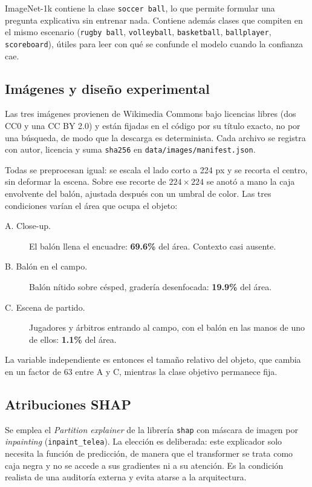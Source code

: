 \documentclass[11pt]{article}
\begin{document}
ImageNet-1k contiene la clase \texttt{soccer ball}, lo que permite formular una
pregunta explicativa sin entrenar nada. Contiene además clases que compiten en el
mismo escenario (\texttt{rugby ball}, \texttt{volleyball}, \texttt{basketball},
\texttt{ballplayer}, \texttt{scoreboard}), útiles para leer con qué se confunde el
modelo cuando la confianza cae.

\subsection{Imágenes y diseño experimental}

Las tres imágenes provienen de Wikimedia Commons bajo licencias libres (dos CC0 y una
CC BY 2.0) y están fijadas en el código por su título exacto, no por una búsqueda, de
modo que la descarga es determinista. Cada archivo se registra con autor, licencia y
suma \texttt{sha256} en \texttt{data/images/manifest.json}.

Todas se preprocesan igual: se escala el lado corto a 224 px y se recorta el centro,
sin deformar la escena. Sobre ese recorte de $224\times224$ se anotó a mano la caja
envolvente del balón, ajustada después con un umbral de color. Las tres condiciones
varían el área que ocupa el objeto:

\begin{description}
  \item[A. Close-up.] El balón llena el encuadre: \textbf{69.6\%} del área. Contexto
        casi ausente.
  \item[B. Balón en el campo.] Balón nítido sobre césped, gradería desenfocada:
        \textbf{19.9\%} del área.
  \item[C. Escena de partido.] Jugadores y árbitros entrando al campo, con el balón
        en las manos de uno de ellos: \textbf{1.1\%} del área.
\end{description}

La variable independiente es entonces el tamaño relativo del objeto, que cambia en
un factor de $63$ entre A y C, mientras la clase objetivo permanece fija.

\subsection{Atribuciones SHAP}

Se emplea el \emph{Partition explainer} de la librería \texttt{shap} con máscara de
imagen por \emph{inpainting} (\texttt{inpaint\_telea}). La elección es deliberada:
este explicador solo necesita la función de predicción, de manera que el transformer
se trata como caja negra y no se accede a sus gradientes ni a su atención. Es la
condición realista de una auditoría externa y evita atarse a la arquitectura.
\end{document}
